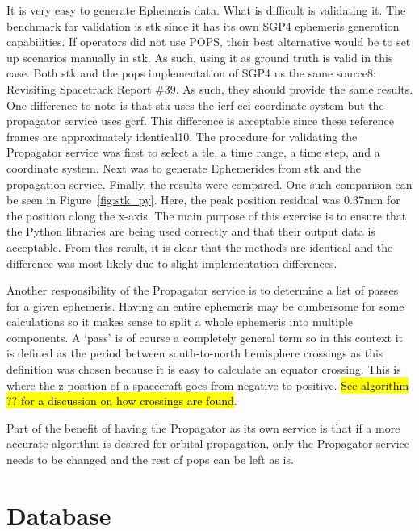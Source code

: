 It is very easy to generate Ephemeris data. What is difficult is validating it.
The benchmark for validation is \gls{stk} since it has its own SGP4 ephemeris
generation capabilities. If operators did not use POPS, their best alternative
would be to set up scenarios manually in \gls{stk}. As such, using it as ground
truth is valid in this case. Both \gls{stk} and the \gls{pops} implementation
of SGP4 us the same source8: Revisiting Spacetrack Report \#39. As such, they
should provide the same results. One difference to note is that \gls{stk} uses
the \gls{icrf} \gls{eci} coordinate system but the propagator service uses
\gls{gcrf}.  This difference is acceptable since these reference frames are
approximately identical10. The procedure for validating the Propagator service
was first to select a \gls{tle}, a time range, a time step, and a coordinate
system.  Next was to generate Ephemerides from \gls{stk} and the propagation
service.  Finally, the results were compared. One such comparison can be seen
in Figure~\ref{fig:stk_py}. Here, the peak position residual was 0.37mm for the position along
the x-axis. The main purpose of this exercise is to ensure that the Python
libraries are being used correctly and that their output data is acceptable.
From this result, it is clear that the methods are identical and the difference
was most likely due to slight implementation differences. 

Another responsibility of the Propagator service is to determine a list of
passes for a given ephemeris. Having an entire ephemeris may be cumbersome for
some calculations so it makes sense to split a whole ephemeris into multiple
components. A `pass' is of course a completely general term so in this context
it is defined as the period between south-to-north hemisphere crossings as this
definition was chosen because it is easy to calculate an equator crossing. This
is where the z-position of a spacecraft goes from negative to positive.
\hl{See algorithm ?? for a discussion on how crossings are found}.

Part of the benefit of having the Propagator as its own service is that if a
more accurate algorithm is desired for orbital propagation, only the Propagator
service needs to be changed and the rest of \gls{pops} can be left as is.



\section{Database}


